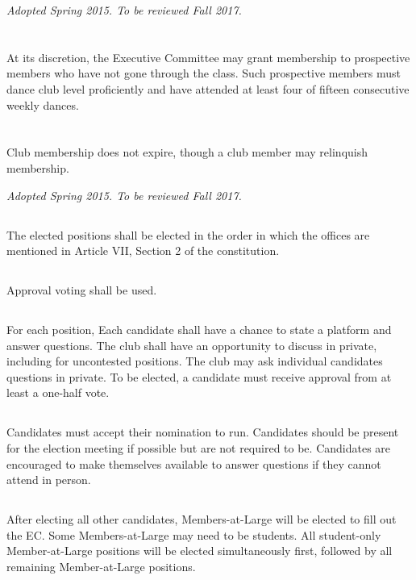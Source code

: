 \documentclass{bylaws}
\newcommand{\sptimes}[2]{\emph{Adopted #1. To be reviewed #2.}}
\begin{document}
\sptimes{Spring 2015}{Fall 2017}

\section{}At its discretion, the Executive Committee may grant membership to prospective members who have not gone through the class. Such prospective members must dance club level proficiently and have attended at least four of fifteen consecutive weekly dances.
\section{}Club membership does not expire, though a club member may relinquish membership.


\sptimes{Spring 2015}{Fall 2017}


\subsection{}The elected positions shall be elected in the order in which the offices are mentioned in Article VII, Section 2 of the constitution. 
\subsection{}Approval voting shall be used. 
\subsection{}For each position,
\duty Each candidate shall have a chance to state a platform and answer questions.
\duty The club shall have an opportunity to discuss in private, including for uncontested positions.
\duty The club may ask individual candidates questions in private.
\duty To be elected, a candidate must receive approval from at least a one-half vote.  
\subsection{}Candidates must accept their nomination to run. Candidates should be present for the election meeting if possible but are not required to be. Candidates are encouraged to make themselves available to answer questions if they cannot attend in person.
\subsection{}After electing all other candidates, Members-at-Large will be elected to fill out the EC. Some Members-at-Large may need to be students. All student-only Member-at-Large positions will be elected simultaneously first, followed by all remaining Member-at-Large positions. 
\end{document}

